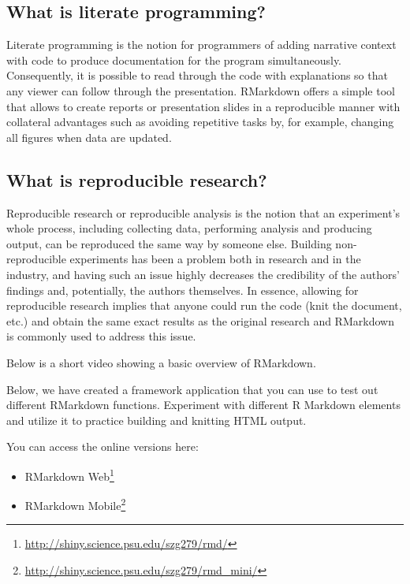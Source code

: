 \documentclass[12pt,]{krantz}
\providecommand{\tightlist}{%
  \setlength{\itemsep}{0pt}\setlength{\parskip}{0pt}}
\renewcommand{\href}[2]{#2\footnote{\url{#1}}}
\begin{document}
\subsection*{\texorpdfstring{What is \textbf{literate}
programming?}{What is literate programming?}}\label{what-is-literate-programming}

Literate programming is the notion for programmers of adding narrative
context with code to produce documentation for the program
simultaneously. Consequently, it is possible to read through the code
with explanations so that any viewer can follow through the
presentation. RMarkdown offers a simple tool that allows to create
reports or presentation slides in a reproducible manner with collateral
advantages such as avoiding repetitive tasks by, for example, changing
all figures when data are updated.

\subsection*{\texorpdfstring{What is \textbf{reproducible}
research?}{What is reproducible research?}}\label{what-is-reproducible-research}


Reproducible research or reproducible analysis is the notion that an
experiment's whole process, including collecting data, performing
analysis and producing output, can be reproduced the same way by someone
else. Building non-reproducible experiments has been a problem both in
research and in the industry, and having such an issue highly decreases
the credibility of the authors' findings and, potentially, the authors
themselves. In essence, allowing for reproducible research implies that
anyone could run the code (knit the document, etc.) and obtain the same
exact results as the original research and RMarkdown is commonly used to
address this issue.

Below is a short video showing a basic overview of RMarkdown.

Below, we have created a framework application that you can use to test
out different RMarkdown functions. Experiment with different R Markdown
elements and utilize it to practice building and knitting HTML output.

You can access the online versions here:

\begin{itemize}
\tightlist
\item
  \href{http://shiny.science.psu.edu/szg279/rmd/}{RMarkdown Web}
\item
  \href{http://shiny.science.psu.edu/szg279/rmd_mini/}{RMarkdown Mobile}
\end{itemize}
\end{document}
